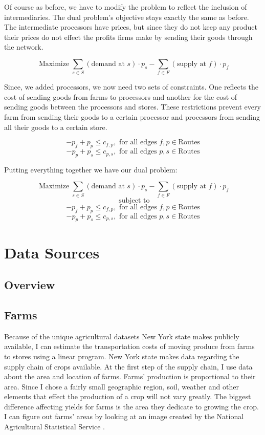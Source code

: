 \documentclass{report}
\begin{document}
Of course as before, we have to modify the problem to reflect the inclusion of intermediaries. The dual problem's objective stays exactly the same as before. The intermediate processors have prices, but since they do not keep any product their prices do not effect the profits firms make by sending their goods through the network.

$$\operatorname{Maximize} \sum_{s \in S}  (\text{demand at } s) \cdot p_{s} -   \sum_{f \in F}  (\text{supply at } f) \cdot p_{f} $$

Since, we added processors, we now need two sets of constraints. One reflects the cost of sending goods from farms to processors and another for the cost of sending goods between the processors and stores. These restrictions prevent every farm from sending their goods to a certain processor and processors from sending all their goods to a certain store.

$$ -p_f + p_p \leq c_{f,p}, \text{ for all edges }  f,p\in \textrm{Routes}$$
$$ -p_p + p_s \leq c_{p,s}, \text{ for all edges }  p,s\in \textrm{Routes}$$

Putting everything together we have our dual problem:

$$\operatorname{Maximize} \sum_{s \in S}  (\text{demand at } s) \cdot p_{s} -   \sum_{f \in F}  (\text{supply at } f) \cdot p_{f} $$
$$ \text{ subject to}$$
$$ -p_f + p_p \leq c_{f,p}, \text{ for all edges } f,p\in \textrm{Routes}$$
$$ -p_p + p_s \leq c_{p,s}, \text{ for all edges } p,s\in \textrm{Routes}$$


\chapter{Data Sources}

\section{Overview}

\section{Farms}

Because of the unique agricultural datasets New York state makes publicly available, I can estimate the transportation costs of moving produce from farms to stores using a linear program. New York state makes data regarding the supply chain of crops available. At the first step of the supply chain, I use data about the area and location of farms. Farms' production is proportional to their area. Since I chose a fairly small geographic region, soil, weather and other elements that effect the production of a crop will not vary greatly. The biggest difference affecting yields for farms is the area they dedicate to growing the crop. I can figure out farms' areas by looking at an image created by the National Agricultural Statistical Service \cite{nass}.
\end{document}
